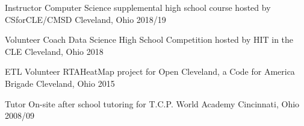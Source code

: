 

\begin{cvhonors}

  \cvhonor
    {Instructor} %
    {Computer Science supplemental high school course hosted by CSforCLE/CMSD} %
    {Cleveland, Ohio} %
    {2018/19} %

  \cvhonor
    {Volunteer Coach} %
    {Data Science High School Competition hosted by HIT in the CLE} %
    {Cleveland, Ohio} %
    {2018} %

  \cvhonor
    {ETL Volunteer} %
    {RTAHeatMap project for Open Cleveland, a Code for America Brigade} %
    {Cleveland, Ohio} %
    {2015} %

  \cvhonor
    {Tutor} %
    {On-site after school tutoring for T.C.P. World Academy} %
    {Cincinnati, Ohio} %
    {2008/09} %

\end{cvhonors}
